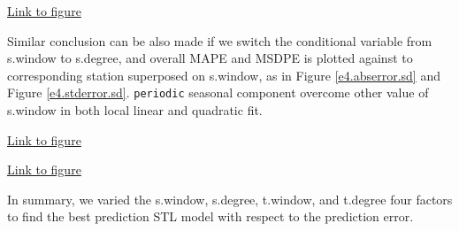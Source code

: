 \begin{framed}
\begin{center}
  \href{../plots/a1950/E4/tmax.mean.std.error.sw.pdf}{Link to figure}
  \label{e4.stderror.sw}
\end{center}
\end{framed}

Similar conclusion can be also made if we switch the conditional variable from
s.window to s.degree, and overall MAPE and MSDPE is plotted against to 
corresponding station superposed on s.window, as in Figure 
\href{../plots/a1950/E4/tmax.mean.std.error.sw.pdf}{\ref*{e4.abserror.sd}} and 
Figure \href{../plots/a1950/E4/tmax.mean.std.error.sd.pdf}{\ref*{e4.stderror.sd}}.
\texttt{periodic} seasonal component overcome other value of s.window in both
local linear and quadratic fit.


\begin{framed}
\begin{center}
  \href{../plots/a1950/E4/tmax.mean.absmeans.error.sd.pdf}{Link to figure}
  \label{e4.abserror.sd}
\end{center}
\end{framed}

\begin{framed}
\begin{center}
  \href{../plots/a1950/E4/tmax.mean.std.error.sd.pdf}{Link to figure}
  \label{e4.stderror.sd}
\end{center}
\end{framed}

In summary, we varied the s.window, s.degree, t.window, and t.degree four factors
to find the best prediction STL model with respect to the prediction error.
